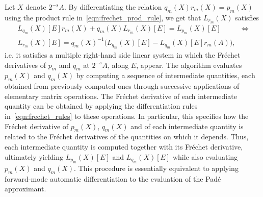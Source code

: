 Let $X$ denote $2^{-s}A$. By differentiating the relation $q_m(X)r_m(X)=p_m(X)$  using the product rule in~\eqref{eqn:frechet_prod_rule}, we get that $L_{r_m}(X)$ satisfies
\begin{align*}
	L_{q_m}(X)[E]r_m(X)+q_m(X)L_{r_m}(X)[E]=L_{p_m}(X)[E] &\iff \\
	L_{r_m}(X)[E] = q_m(X)^{-1}\big(L_{q_m}(X)[E]-L_{q_m}(X)[E]r_m(A)\big), &
\end{align*}
i.e. it satisfies a multiple right-hand side linear system in which the Fréchet derivatives of $p_m$ and $q_m$ at $2^{-s}A$, along $E$, appear. The algorithm evaluates $p_m(X)$ and $q_m(X)$ by computing a sequence of intermediate quantities, each obtained from previously computed ones through successive applications of elementary matrix operations. 
The Fréchet derivative of each intermediate quantity can be obtained by applying the differentiation rules in~\eqref{eqn:frechet_rules} to these operations. In particular, this specifies how the Fréchet derivative of $p_m(X)$, $q_m(X)$ and of each intermediate quantity is related to the Fréchet derivatives of the quantities on which it depends.
Thus, each intermediate quantity is computed together with its Fréchet derivative, ultimately yielding $L_{p_m}(X)[E]$ and $L_{q_m}(X)[E]$ while also evaluating $p_m(X)$ and $q_m(X)$. This procedure is essentially equivalent to applying forward-mode automatic differentiation to the evaluation of the Padé approximant.


